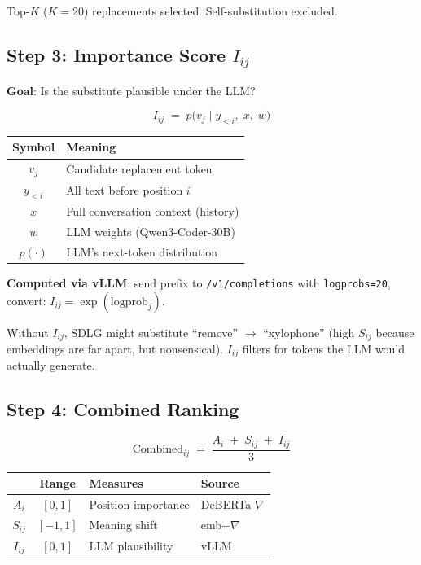 \documentclass[10pt,a4paper,twocolumn]{article}
\begin{document}
Top-$K$ ($K{=}20$) replacements selected. Self-substitution excluded.

\subsection{Step 3: Importance Score $I_{ij}$}

\textbf{Goal}: Is the substitute plausible under the LLM?

\begin{mathbox}[title=Importance Score]
\[
I_{ij} \;=\; p\bigl(v_j \;\big|\; y_{<i},\; x,\; w\bigr)
\]
\end{mathbox}

\begin{small}
\begin{tabular}{@{}cl@{}}
\toprule
\textbf{Symbol} & \textbf{Meaning} \\
\midrule
$v_j$ & Candidate replacement token \\
$y_{<i}$ & All text before position $i$ \\
$x$ & Full conversation context (history) \\
$w$ & LLM weights (Qwen3-Coder-30B) \\
$p(\cdot)$ & LLM's next-token distribution \\
\bottomrule
\end{tabular}
\end{small}

\textbf{Computed via vLLM}: send prefix to \texttt{/v1/completions} with \texttt{logprobs=20}, convert: $I_{ij} = \exp(\text{logprob}_j)$.

\begin{notebox}[title=Why I\textsubscript{ij} matters]
\scriptsize
Without $I_{ij}$, SDLG might substitute ``remove'' $\to$ ``xylophone'' (high $S_{ij}$ because embeddings are far apart, but nonsensical). $I_{ij}$ filters for tokens the LLM would actually generate.
\end{notebox}

\subsection{Step 4: Combined Ranking}

\begin{mathbox}[title=Combined Score]
\[
\text{Combined}_{ij} \;=\; \frac{A_i \;+\; S_{ij} \;+\; I_{ij}}{3}
\]
\end{mathbox}

\begin{scriptsize}
\begin{tabular}{@{}ccp{}l@{}}
\toprule
 & \textbf{Range} & \textbf{Measures} & \textbf{Source} \\
\midrule
$A_i$ & $[0,1]$ & Position importance & DeBERTa $\nabla$ \\
$S_{ij}$ & $[-1,1]$ & Meaning shift & emb+$\nabla$ \\
$I_{ij}$ & $[0,1]$ & LLM plausibility & vLLM \\
\bottomrule
\end{tabular}
\end{scriptsize}
\end{document}

